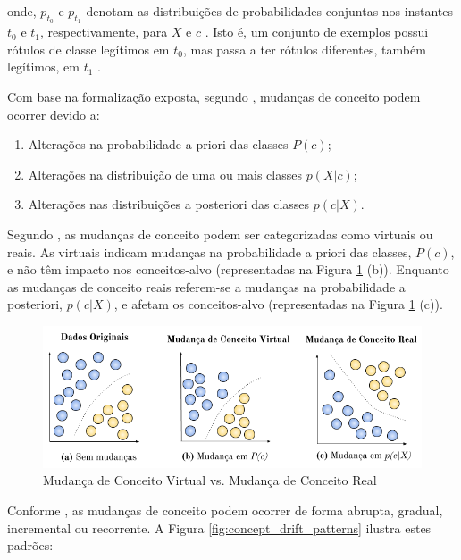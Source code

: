 \documentclass[qual, classic, a4paper]{ufbathesis}
\begin{document}
onde, $p_{t_0}$ e $p_{t_1}$ denotam as distribuições de probabilidades conjuntas nos instantes $t_0$ e $t_1$, respectivamente, 
para $X$ e $c$ \cite{Gama:2014:SCD:2597757.2523813}. 
Isto é, um conjunto de exemplos possui rótulos de classe legítimos em $t_0$, mas passa a ter rótulos diferentes, também legítimos, em $t_1$ \cite{Kolter:2007:DWM:1314498.1390333}.

Com base na formalização exposta, segundo \cite{Zliobaite:2010}, mudanças de conceito podem ocorrer devido a:

\begin{enumerate}
    \item Alterações na probabilidade a priori das classes $P(c)$;
    \item Alterações na distribuição de uma ou mais classes $p(X|c)$;
    \item Alterações nas distribuições a posteriori das classes $p(c|X)$.
\end{enumerate}

Segundo \cite{Zliobaite:2010, Gama:2014:SCD:2597757.2523813}, as mudanças de conceito podem ser categorizadas como virtuais ou reais.
As virtuais indicam mudanças na probabilidade a priori das classes, $P(c)$, e não têm impacto nos conceitos-alvo (representadas na Figura \ref{fig:real_and_virtual_concept_drift} (b)).
Enquanto as mudanças de conceito reais referem-se a mudanças na probabilidade a posteriori, $p(c|X)$, e afetam os conceitos-alvo (representadas na Figura \ref{fig:real_and_virtual_concept_drift} (c)).

\begin{figure}[H]
\begin{center}
    \includegraphics[scale=0.8]{imagens/concept_drift.png}
    \caption{Mudança de Conceito Virtual vs. Mudança de Conceito Real}
    \label{fig:real_and_virtual_concept_drift}
\end{center}
\end{figure}

Conforme \cite{Gama:2014:SCD:2597757.2523813}, as mudanças de conceito podem ocorrer de forma abrupta, gradual, incremental ou recorrente.
A Figura \ref{fig:concept_drift_patterns} ilustra estes padrões:
\end{document}
